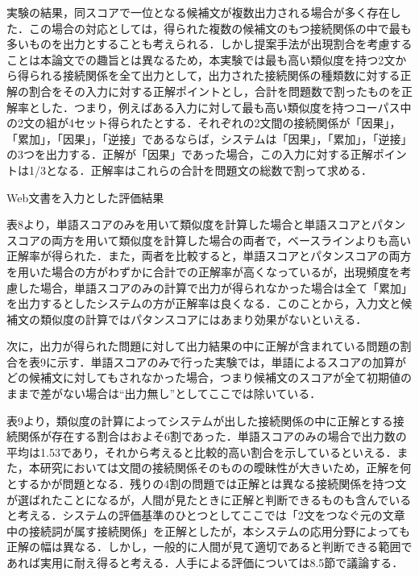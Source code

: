 \documentclass[japanese]{jnlp_1.4}
\begin{document}
実験の結果，同スコアで一位となる候補文が複数出力される場合が多く存在した．この場合の対応としては，得られた複数の候補文のもつ接続関係の中で最も多いものを出力とすることも考えられる．しかし提案手法が出現割合を考慮することは本論文での趣旨とは異なるため，本実験では最も高い類似度を持つ2文から得られる接続関係を全て出力として，出力された接続関係の種類数に対する正解の割合をその入力に対する正解ポイントとし，合計を問題数で割ったものを正解率とした．つまり，例えばある入力に対して最も高い類似度を持つコーパス中の2文の組が4セット得られたとする．それぞれの2文間の接続関係が「因果」，「累加」，「因果」，「逆接」であるならば，システムは「因果」，「累加」，「逆接」の3つを出力する．正解が「因果」であった場合，この入力に対する正解ポイントは1/3となる．正解率はこれらの合計を問題文の総数で割って求める．


\begin{table}[t]
\caption{Web文書を入力とした評価結果}

\end{table}

表8より，単語スコアのみを用いて類似度を計算した場合と単語スコアとパタンスコアの両方を用いて類似度を計算した場合の両者で，ベースラインよりも高い正解率が得られた．また，両者を比較すると，単語スコアとパタンスコアの両方を用いた場合の方がわずかに合計での正解率が高くなっているが，出現頻度を考慮した場合，単語スコアのみの計算で出力が得られなかった場合は全て「累加」を出力するとしたシステムの方が正解率は良くなる．このことから，入力文と候補文の類似度の計算ではパタンスコアにはあまり効果がないといえる．

次に，出力が得られた問題に対して出力結果の中に正解が含まれている問題の割合を表9に示す．単語スコアのみで行った実験では，単語によるスコアの加算がどの候補文に対してもされなかった場合，つまり候補文のスコアが全て初期値のままで差がない場合は``出力無し''としてここでは除いている．

表9より，類似度の計算によってシステムが出した接続関係の中に正解とする接続関係が存在する割合はおよそ6割であった．単語スコアのみの場合で出力数の平均は1.53であり，それから考えると比較的高い割合を示しているといえる．また，本研究においては文間の接続関係そのものの曖昧性が大きいため，正解を何とするかが問題となる．残りの4割の問題では正解とは異なる接続関係を持つ文が選ばれたことになるが，人間が見たときに正解と判断できるものも含んでいると考える．システムの評価基準のひとつとしてここでは「2文をつなぐ元の文章中の接続詞が属す接続関係」を正解としたが，本システムの応用分野によっても正解の幅は異なる．しかし，一般的に人間が見て適切であると判断できる範囲であれば実用に耐え得ると考える．人手による評価については8.5節で議論する．
\end{document}
